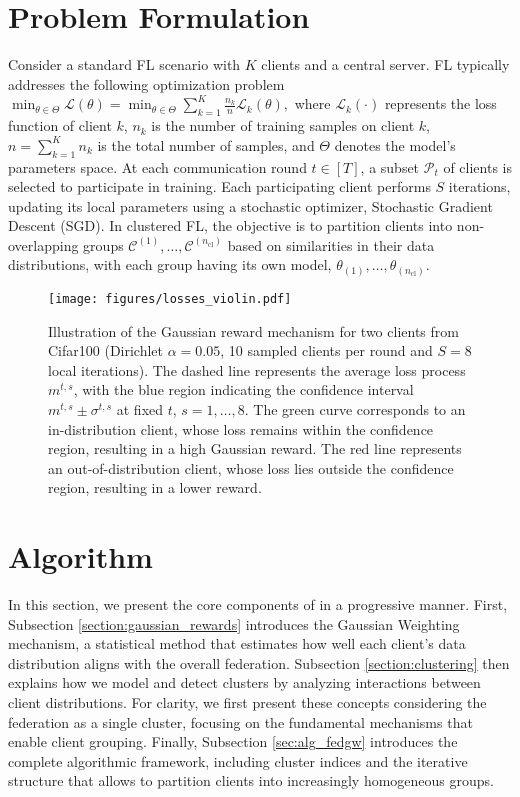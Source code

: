 \section{Problem Formulation}
\label{section:formulation}
Consider a standard FL scenario \citep{mcmahan2017communication} with $K$ clients and a central server. FL typically addresses the following optimization problem $\min_{\theta \in \Theta} \mathcal{L}(\theta) = \min_{\theta \in \Theta} \sum_{k=1}^K \frac{n_k}{n} \mathcal{L}_k(\theta),$
where $\mathcal{L}_k(\cdot)$ represents the loss function of client $k$, $n_k$ is the number of training samples on client $k$, $n = \sum_{k=1}^K n_k$ is the total number of samples, and $\Theta$ denotes the model's parameters space.  
At each communication round $t \in [T]$, a subset $\mathcal{P}_t$ of clients is selected to participate in training. Each participating client performs $S$ iterations, updating its local parameters using a stochastic optimizer, \eg Stochastic Gradient Descent (SGD).  
In clustered FL, the objective is to partition clients into non-overlapping groups $\mathcal{C}^{(1)}, \dots, \mathcal{C}^{(n_\text{cl})}$ based on similarities in their data distributions, with each group having its own model, $\theta_{(1)}, \dots, \theta_{(n_\text{cl})}$.
\begin{figure}[t]
    \centering
    \texttt{[image: figures/losses\_violin.pdf]}
    \vspace{-2.7em}
   {\caption{\small{Illustration of the Gaussian reward mechanism for two clients from Cifar100 (Dirichlet $\alpha = 0.05$, 10 sampled clients per round and $S = 8$ local iterations).
    The dashed line represents the average loss process $m^{t,s}$, with the blue region indicating the confidence interval $m^{t,s} \pm \sigma^{t,s}$ at fixed $t$, $s = 1,\dots, 8$. The green curve corresponds to an in-distribution client, whose loss remains within the confidence region, resulting in a high Gaussian reward. The red line represents an out-of-distribution client, whose loss lies outside the confidence region, resulting in a lower reward. } %
    }\label{fig:mechanism}

}\vspace{-2em}
\end{figure}
\section{\shortname Algorithm}\label{sec:algorithm_new}
In this section, we present the core components of \shortname in a progressive manner. First, Subsection \ref{section:gaussian_rewards} introduces the Gaussian Weighting mechanism, a statistical method that estimates how well each client's data distribution aligns with the overall federation. Subsection \ref{section:clustering} then explains how we model and detect clusters by analyzing interactions between client distributions. 
For clarity, we first present these concepts considering the federation as a single cluster, focusing on the fundamental mechanisms that enable client grouping. Finally, Subsection \ref{sec:alg_fedgw} introduces the complete algorithmic framework, including cluster indices and the iterative structure that allows \shortname to partition clients into increasingly homogeneous groups.


